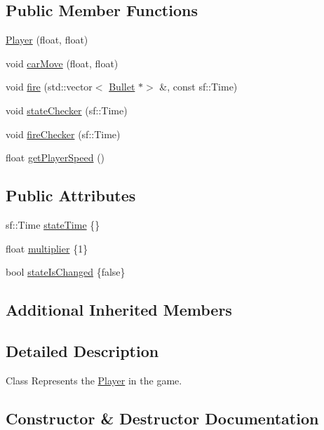 \subsection*{Public Member Functions}
\begin{DoxyCompactItemize}
\item 
\hyperlink{classPlayer_a502255d0928df823d53f07a0adf5da7e}{Player} (float, float)
\item 
void \hyperlink{classPlayer_a962661bbdff64b195582edbd0dcb3e1e}{car\+Move} (float, float)
\item 
void \hyperlink{classPlayer_a8dded6e745a81ad9f0be87b865856de7}{fire} (std\+::vector$<$ \hyperlink{classBullet}{Bullet} $\ast$$>$ \&, const sf\+::\+Time)
\item 
void \hyperlink{classPlayer_a67f90504cb942a07e98a54b58d4d4a1e}{state\+Checker} (sf\+::\+Time)
\item 
void \hyperlink{classPlayer_a230f0202bf208e5f9c3e0ab54c2c4b15}{fire\+Checker} (sf\+::\+Time)
\item 
float \hyperlink{classPlayer_ab72ff0a99c17ace352a5a44bec0bfa5c}{get\+Player\+Speed} ()
\end{DoxyCompactItemize}
\subsection*{Public Attributes}
\begin{DoxyCompactItemize}
\item 
sf\+::\+Time \hyperlink{classPlayer_a1dd84364f2b6c74be91d6d9cc2430f59}{state\+Time} \{\}
\item 
float \hyperlink{classPlayer_a7b4a4d41e6c36265588539e960f4804f}{multiplier} \{1\}
\item 
bool \hyperlink{classPlayer_ac074e83f791eb282589df6b9456781b7}{state\+Is\+Changed} \{false\}
\end{DoxyCompactItemize}
\subsection*{Additional Inherited Members}


\subsection{Detailed Description}
Class Represents the \hyperlink{classPlayer}{Player} in the game. 

\subsection{Constructor \& Destructor Documentation}
\mbox{\label{classPlayer_a502255d0928df823d53f07a0adf5da7e}} 
